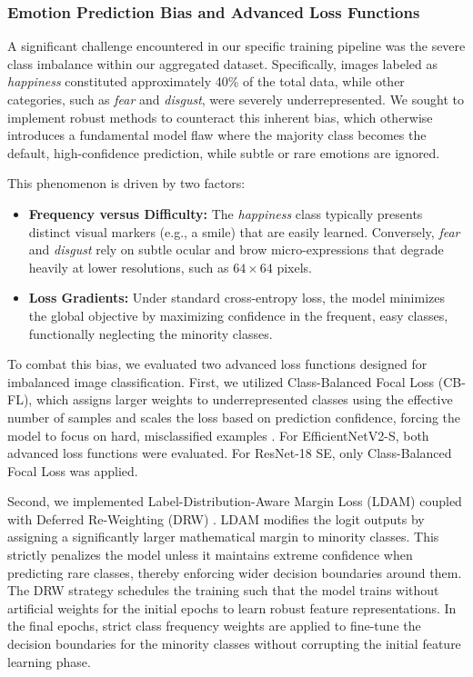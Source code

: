 \subsubsection{Emotion Prediction Bias and Advanced Loss Functions}
A significant challenge encountered in our specific training pipeline was the severe class imbalance within our aggregated dataset. Specifically, images labeled as \textit{happiness} constituted approximately 40\% of the total data, while other categories, such as \textit{fear} and \textit{disgust}, were severely underrepresented. We sought to implement robust methods to counteract this inherent bias, which otherwise introduces a fundamental model flaw where the majority class becomes the default, high-confidence prediction, while subtle or rare emotions are ignored.

This phenomenon is driven by two factors:
\begin{itemize}
    \item \textbf{Frequency versus Difficulty:} The \textit{happiness} class typically presents distinct visual markers (e.g., a smile) that are easily learned. Conversely, \textit{fear} and \textit{disgust} rely on subtle ocular and brow micro-expressions that degrade heavily at lower resolutions, such as $64 \times 64$ pixels.
    \item \textbf{Loss Gradients:} Under standard cross-entropy loss, the model minimizes the global objective by maximizing confidence in the frequent, easy classes, functionally neglecting the minority classes.
\end{itemize}

To combat this bias, we evaluated two advanced loss functions designed for imbalanced image classification. First, we utilized Class-Balanced Focal Loss (CB-FL), which assigns larger weights to underrepresented classes using the effective number of samples and scales the loss based on prediction confidence, forcing the model to focus on hard, misclassified examples \cite{cui2019classbalancedlossbasedeffective}.
For EfficientNetV2-S, both advanced loss functions were evaluated. For ResNet-18 SE, only Class-Balanced Focal Loss was applied.

Second, we implemented Label-Distribution-Aware Margin Loss (LDAM) coupled with Deferred Re-Weighting (DRW) \cite{cao2019learning}. LDAM modifies the logit outputs by assigning a significantly larger mathematical margin to minority classes. This strictly penalizes the model unless it maintains extreme confidence when predicting rare classes, thereby enforcing wider decision boundaries around them. The DRW strategy schedules the training such that the model trains without artificial weights for the initial epochs to learn robust feature representations. In the final epochs, strict class frequency weights are applied to fine-tune the decision boundaries for the minority classes without corrupting the initial feature learning phase.

